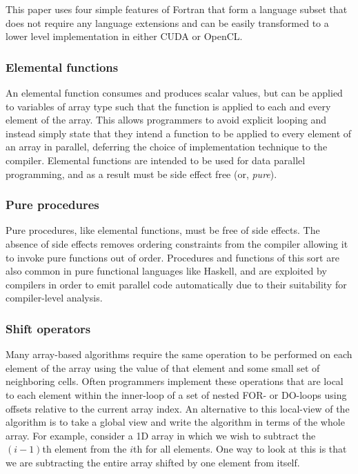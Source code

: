 \documentclass[10pt, conference, compsocconf]{IEEEtran}
\begin{document}
This paper uses four simple features of Fortran that form a language subset
that does not require any language extensions and can be easily transformed
to a lower level implementation in either CUDA or OpenCL.

\subsubsection*{Elemental functions}

An elemental function consumes and produces scalar values, but can be
applied to variables of array type such that the function is
applied to each and every element of the array.  This allows programmers
to avoid explicit looping and instead simply state that they intend a
function to be applied to every element of an array in parallel, deferring
the choice of implementation technique to the compiler.  Elemental
functions are intended to be used for data parallel programming, and
as a result must be side effect free (or, \emph{pure}).

\subsubsection*{Pure procedures}

Pure procedures, like elemental functions, must be free of side effects.
The absence of side effects removes ordering constraints from the compiler
allowing it to invoke pure functions out of order.  Procedures and functions
of this sort are also common in pure functional languages like Haskell,
and are exploited by compilers in order to emit parallel code automatically
due to their suitability for compiler-level analysis.

\subsubsection*{Shift operators}

Many array-based algorithms require the same operation to be performed
on each element of the array using the value of that element and some small
set of neighboring cells.  Often programmers implement these operations that
are local to each element within the inner-loop of a set of nested FOR-
or DO-loops using offsets relative to the current array index.  An alternative
to this local-view of the algorithm is to take a global view and write the
algorithm in terms of the whole array.  For example, consider a 1D array in
which we wish to subtract the $(i-1)$th element from the $i$th for all
elements.  One way to look at this is that we are subtracting the entire array
shifted by one element from itself.
\end{document}
